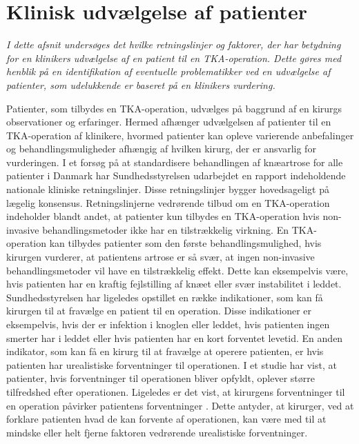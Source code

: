 \section{Klinisk udvælgelse af patienter}
\textit{I dette afsnit undersøges det hvilke retningslinjer og faktorer, der har betydning for en klinikers udvælgelse af en patient til en TKA-operation. Dette gøres med henblik på en identifikation af eventuelle problematikker ved en udvælgelse af patienter, som udelukkende er baseret på en klinikers vurdering.}

Patienter, som tilbydes en TKA-operation, udvælges på baggrund af en kirurgs observationer og erfaringer. Hermed afhænger udvælgelsen af patienter til en TKA-operation af klinikere, hvormed patienter kan opleve varierende anbefalinger og behandlingsmuligheder afhængig af hvilken kirurg, der er ansvarlig for vurderingen.  I et forsøg på at standardisere behandlingen af knæartrose for alle patienter i Danmark har Sundhedsstyrelsen udarbejdet en rapport indeholdende nationale kliniske retningslinjer. Disse retningslinjer bygger hovedsageligt på lægelig konsensus. Retningslinjerne vedrørende tilbud om en TKA-operation indeholder blandt andet, at patienter kun tilbydes en TKA-operation hvis non-invasive behandlingsmetoder ikke har en tilstrækkelig virkning. En TKA-operation kan tilbydes patienter som den første behandlingsmulighed, hvis kirurgen vurderer, at patientens artrose er så svær, at ingen non-invasive behandlingsmetoder vil have en tilstrækkelig effekt. Dette kan eksempelvis være, hvis patienten har en kraftig fejlstilling af knæet eller svær instabilitet i leddet. \citep{brostrom2012} \\
Sundhedsstyrelsen har ligeledes opstillet en række indikationer, som kan få kirurgen til at fravælge en patient til en operation. Disse indikationer er eksempelvis, hvis der er infektion i knoglen eller leddet, hvis patienten ingen smerter har i leddet eller hvis patienten har en kort forventet levetid. En anden indikator, som kan få en kirurg til at fravælge at operere patienten, er hvis patienten har urealistiske forventninger til operationen. \citep{brostrom2012} I et studie har  vist, at patienter, hvis forventninger til operationen bliver opfyldt, oplever større tilfredshed efter operationen. Ligeledes er det vist, at kirurgens forventninger til en operation påvirker patientens forventninger \citep{tejada2010}. Dette antyder, at kirurger, ved at forklare patienten hvad de kan forvente af operationen, kan være med til at mindske eller helt fjerne faktoren vedrørende urealistiske forventninger. \\
